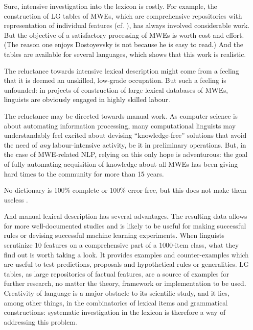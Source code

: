 \documentclass[output=paper]{langsci/langscibook}
\begin{document}
Sure, intensive investigation into the lexicon is costly. For example, the construction of LG tables of MWEs, which are comprehensive repositories with representation of individual features (cf. ), has always involved considerable work. But the objective of a satisfactory processing of MWEs is worth cost and effort. (The reason one enjoys Dostoyevsky is not because he is easy to read.) And the tables are available for several languages, which shows that this work is realistic.

The reluctance towards intensive lexical description might come from a feeling that it is deemed an unskilled, low-grade occupation. But such a feeling is unfounded: in projects of construction of large lexical databases of MWEs, linguists are obviously engaged in highly skilled labour.

The reluctance may be directed towards manual work. As computer science is about automating information processing, many computational linguists may understandably feel excited about devising “knowledge-free” solutions that avoid the need of \textit{any} labour-intensive activity, be it in preliminary operations. But, in the case of MWE-related NLP, relying on this only hope is adventurous: the goal of fully automating acquisition of knowledge about all MWEs has been giving hard times to the community for more than 15 years.

No dictionary is 100\% complete or 100\% error-free, but this does not make them useless%
%
%
%
.

\largerpage
And manual lexical description has several advantages. The resulting data allows for more well-documented studies and is likely to be useful for making successful rules or devising successful machine learning experiments. When linguists scrutinize 10 features on a comprehensive part of a 1000-item class, what they find out is worth taking a look. It provides examples and counter-examples which are useful to test predictions, proposals and hypothetical rules or generalities. 
LG tables, as large repositories of factual features, are a source of examples for further research, no matter the theory, framework or implementation to be used. Creativity of language is a major obstacle to its scientific study, and it lies, among other things, in the combinatorics of lexical items and grammatical constructions: systematic investigation in the lexicon is therefore a way of addressing this problem.
\end{document}

